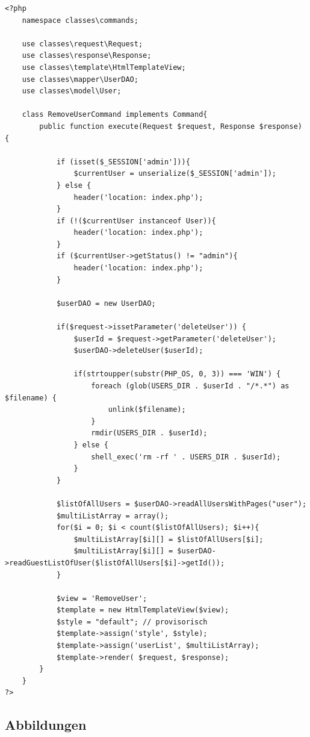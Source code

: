 \documentclass[10.5pt]{scrarticle}
\begin{document}
\begin{lstlisting}[caption={RemoveUserCommand.php}, label={lst:RemoveUserCommand}]
<?php
    namespace classes\commands;

    use classes\request\Request;
    use classes\response\Response;
    use classes\template\HtmlTemplateView;
    use classes\mapper\UserDAO;
    use classes\model\User;

    class RemoveUserCommand implements Command{
        public function execute(Request $request, Response $response) {

            if (isset($_SESSION['admin'])){
                $currentUser = unserialize($_SESSION['admin']);
            } else {
                header('location: index.php');
            }             
            if (!($currentUser instanceof User)){
                header('location: index.php');
            }            
            if ($currentUser->getStatus() != "admin"){
                header('location: index.php');
            }
            
            $userDAO = new UserDAO;

            if($request->issetParameter('deleteUser')) {
                $userId = $request->getParameter('deleteUser');
                $userDAO->deleteUser($userId);

                if(strtoupper(substr(PHP_OS, 0, 3)) === 'WIN') {
                    foreach (glob(USERS_DIR . $userId . "/*.*") as $filename) {
                        unlink($filename);
                    }
                    rmdir(USERS_DIR . $userId);
                } else {
                    shell_exec('rm -rf ' . USERS_DIR . $userId);
                }
            }

            $listOfAllUsers = $userDAO->readAllUsersWithPages("user");
            $multiListArray = array();
            for($i = 0; $i < count($listOfAllUsers); $i++){
                $multiListArray[$i][] = $listOfAllUsers[$i];
                $multiListArray[$i][] = $userDAO->readGuestListOfUser($listOfAllUsers[$i]->getId());
            }

            $view = 'RemoveUser';
            $template = new HtmlTemplateView($view);
            $style = "default"; // provisorisch
            $template->assign('style', $style);
            $template->assign('userList', $multiListArray);
            $template->render( $request, $response);
        }
    }
?>
\end{lstlisting}

\newpage
\subsection{Abbildungen}
\end{document}
